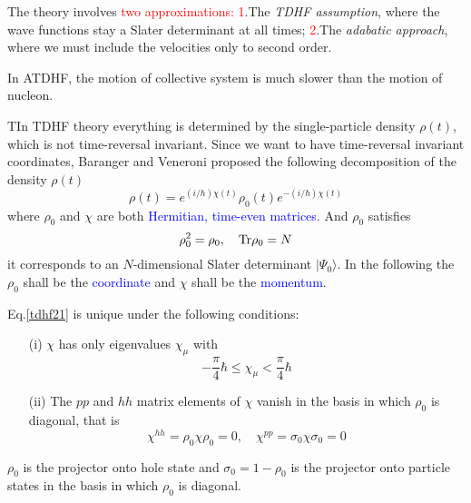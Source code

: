   The theory involves \textcolor{red}{two approximations:} \newline
  \textcolor{red}{1}.The \textit{TDHF assumption}, where the wave functions stay a Slater determinant at all times;\newline
  \textcolor{red}{2}.The \textit{adabatic approach}, where we must include the velocities only to second order.

  In ATDHF, the motion of collective system is much slower than the motion of nucleon.
  \vspace{8pt}

  TIn TDHF theory everything is determined by the single-particle density $\rho(t)$, which is not time-reversal invariant. Since we want to have time-reversal invariant coordinates, Baranger and Veneroni proposed the following decomposition of the density $\rho(t)$
  \begin{equation}
    \rho(t) = e^{(i/\hbar)\chi(t)}\rho_0(t)e^{-(i/\hbar)\chi(t)} \label{tdhf21}
  \end{equation}
  where $\rho_0$ and $\chi$ are both \textcolor{blue}{Hermitian, time-even matrices}. And $\rho_0$ satisfies
  \begin{equation}
    \rho_0^2 = \rho_0, \quad {\rm Tr}\rho_0 = N \label{tdhf22}
  \end{equation}
  it corresponds to an $N$-dimensional Slater determinant $|\Psi_0\rangle$. In the following the $\rho_0$ shall be the \textcolor{blue}{coordinate} and $\chi$ shall be the \textcolor{blue}{momentum}.

  Eq.\eqref{tdhf21} is unique under the following conditions:
  \begin{itemize}
    \item [(i)] $\chi$ has only eigenvalues $\chi_\mu$ with
                \begin{equation}
                  -\frac{\pi}{4}\hbar \leqslant \chi_\mu < \frac{\pi}{4}\hbar \label{tdhf23}
                \end{equation}
    \item[(ii)] The $pp$ and $hh$ matrix elements of $\chi$ vanish in the basis in which $\rho_0$ is diagonal, that is 
                \begin{equation}
                  \chi^{hh}=\rho_0\chi\rho_0=0, \quad \chi^{pp} = \sigma_0\chi\sigma_0=0  \label{tdhf24}
                \end{equation}
  \end{itemize}
  \begin{note}
    $\rho_0$ is the projector onto hole state and $\sigma_0=1-\rho_0$ is the projector onto particle states in the basis in which $\rho_0$ is diagonal.
  \end{note}

